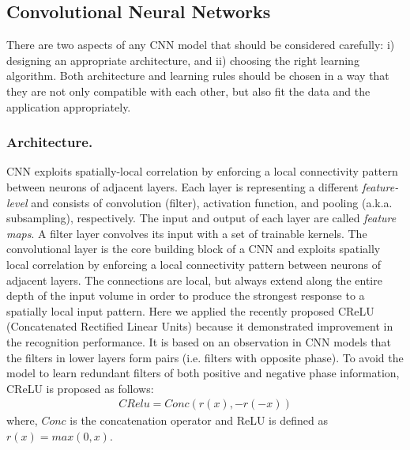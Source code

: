 \documentclass{llncs}
\begin{document}


\subsection{Convolutional Neural Networks}

There are two aspects of any CNN model that should be considered carefully: i) designing an appropriate architecture, and ii) choosing the right learning algorithm.  Both architecture and learning rules should be chosen in a way that they are not only compatible with each other, but also fit the data and the application
appropriately. 

\subsubsection{Architecture.}

CNN exploits spatially-local correlation by enforcing a local connectivity pattern between neurons of adjacent layers. Each layer is representing a different \emph{feature-level} and consists of convolution (filter), activation function, and pooling (a.k.a. subsampling), respectively. The input and output of each layer are called \emph{feature maps}. A filter layer convolves its input with a set of trainable kernels. The convolutional layer is the core building block of a CNN and exploits spatially local correlation by enforcing a local connectivity pattern between neurons of adjacent layers. The connections are local, but always extend along the entire depth of the input volume in order to produce the strongest response to a spatially local input pattern. 
Here we applied the recently proposed CReLU (Concatenated Rectified Linear Units) \cite{crelu} because it demonstrated improvement in the recognition performance. It is based on an observation in CNN models that the filters in lower layers form pairs (i.e. filters with opposite phase). To avoid the model to learn redundant filters of both positive and negative phase information, CReLU is proposed as follows:
\begin{eqnarray}
CRelu = Conc (r(x), -r(-x))
\end{eqnarray}
where, $Conc$ is the concatenation operator and ReLU is defined as $r(x)=max(0,x)$.
\end{document}
